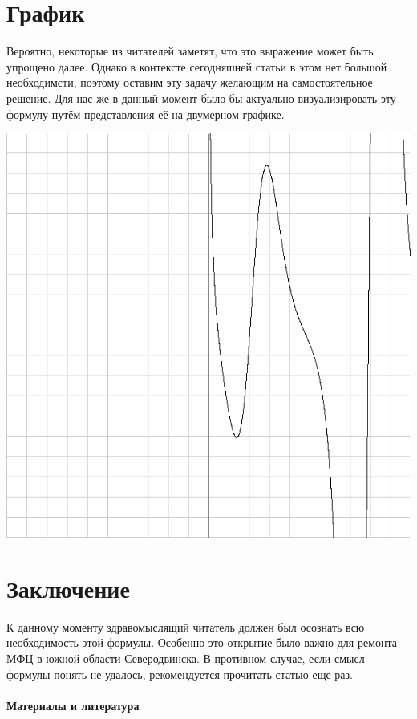 \documentclass{article}
\begin{document}
\begin{center}
\end{center}\section{График}Вероятно, некоторые из читателей заметят, что это выражение может быть упрощено далее. Однако в контексте сегодняшней статьи в этом нет большой необходимсти, поэтому оставим эту задачу желающим на самостоятельное решение. Для нас же в данный момент было бы актуально визуализировать эту формулу путём представления её на двумерном графике.\begin{center}\includegraphics[scale=0.5]{graph.png}
\end{center}\section{Заключение}К данному моменту здравомыслящий читатель должен был осознать всю необходимость этой формулы. Особенно это открытие было важно для ремонта МФЦ в южной области Северодвинска. В противном случае, если смысл формулы понять не удалось, рекомендуется прочитать статью еще раз.\\\paragraph{Материалы и литература}\mbox{}\\
\end{document}
